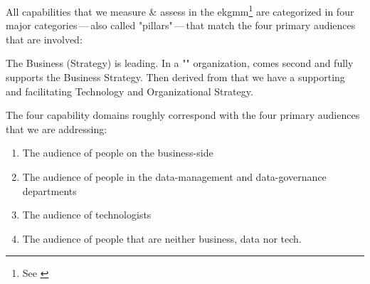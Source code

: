 %
%
\label{sec:the-four-capability-domains}
All capabilities that we measure \& assess in the \gls{ekgmm}\footnote{See \cite{ekgmm}} are categorized
in four major categories\,---\,also called "pillars"\,---\,that match the four primary audiences that are involved:

The Business (Strategy) is leading.
In a "" organization,  comes second and fully supports the
Business Strategy.
Then derived from that we have a supporting and facilitating Technology and Organizational Strategy.

The four capability domains roughly correspond with the four primary audiences that we are addressing:

\begin{enumerate}
    \item The audience of people on the business-side
    \item The audience of people in the data-management and data-governance departments
    \item The audience of technologists
    \item The audience of people that are neither business, data nor tech.
\end{enumerate}
